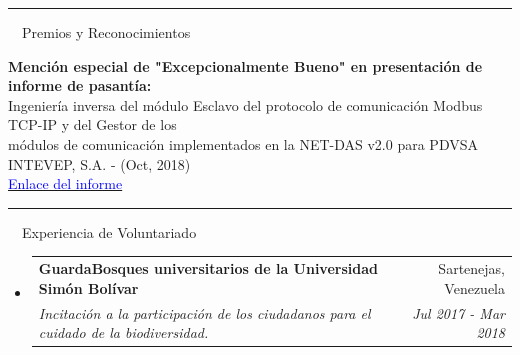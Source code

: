 \documentclass[a4paper,20pt]{article}
\makeatletter
\newcommand{\resumeSubheading}[4]{
  \vspace{-1pt}\item
    \begin{tabular*}{0.97\textwidth}{l@{\extracolsep{\fill}}r}
      \textbf{#1} & #2 \\
      \textit{#3} & \textit{#4} \\
    \end{tabular*}\vspace{-5pt}
}
\newcommand{\resumeSubHeadingListStart}{\begin{itemize}[leftmargin=*]}
\newcommand{\resumeSubHeadingListEnd}{\end{itemize}}
\makeatother
\begin{document}
\vspace{10pt}
 \textcolor{NavyBlue}{ \rule[1mm]{2cm}{2mm} {\LARGE ~~Premios y Reconocimientos}}
\vspace{2pt}
\begin{description}[font=$\bullet$]
\item {\textbf{Mención especial de "Excepcionalmente Bueno" en presentación de informe de pasantía:}}\\
 {Ingeniería inversa del módulo Esclavo del protocolo de comunicación Modbus TCP-IP y del Gestor de los \\módulos de comunicación implementados en la NET-DAS v2.0 para PDVSA INTEVEP, S.A. - (Oct, 2018)}\\
 \vspace{4pt}
 {{\href{https://drive.google.com/file/d/1bHQlD1dOGpO19o5fX3Z03ocKmDDeeF34/view}{\textcolor{Blue}{Enlace del informe}}}}

\end{description}


\vspace{-5pt}
\vspace{10pt}
 \textcolor{NavyBlue}{ \rule[1mm]{2cm}{2mm} {\LARGE ~~Experiencia de Voluntariado}}
\vspace{2pt}
  \resumeSubHeadingListStart
	\resumeSubheading
    {GuardaBosques universitarios de la Universidad Simón Bolívar}{Sartenejas, Venezuela}
    {Incitación a la participación de los ciudadanos para el cuidado de la biodiversidad.}{Jul 2017 - Mar 2018}
\resumeSubHeadingListEnd
\end{document}
